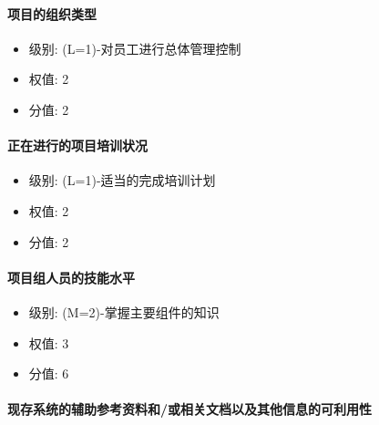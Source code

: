 \documentclass[hyperref, a4paper]{ctexart}
\providecommand{\tightlist}{%
  \setlength{\itemsep}{0pt}\setlength{\parskip}{0pt}}
\let\oldparagraph\paragraph
\renewcommand{\paragraph}[1]{\oldparagraph{#1}\mbox{}}
\begin{document}
\hypertarget{ux9879ux76eeux7684ux7ec4ux7ec7ux7c7bux578b}{%
\paragraph{项目的组织类型}\label{ux9879ux76eeux7684ux7ec4ux7ec7ux7c7bux578b}}

\begin{itemize}
\tightlist
\item
  级别: (L=1)-对员工进行总体管理控制
\item
  权值: 2
\item
  分值: 2
\end{itemize}

\hypertarget{ux6b63ux5728ux8fdbux884cux7684ux9879ux76eeux57f9ux8badux72b6ux51b5}{%
\paragraph{正在进行的项目培训状况}\label{ux6b63ux5728ux8fdbux884cux7684ux9879ux76eeux57f9ux8badux72b6ux51b5}}

\begin{itemize}
\tightlist
\item
  级别: (L=1)-适当的完成培训计划
\item
  权值: 2
\item
  分值: 2
\end{itemize}

\hypertarget{ux9879ux76eeux7ec4ux4ebaux5458ux7684ux6280ux80fdux6c34ux5e73}{%
\paragraph{项目组人员的技能水平}\label{ux9879ux76eeux7ec4ux4ebaux5458ux7684ux6280ux80fdux6c34ux5e73}}

\begin{itemize}
\tightlist
\item
  级别: (M=2)-掌握主要组件的知识
\item
  权值: 3
\item
  分值: 6
\end{itemize}

\hypertarget{ux73b0ux5b58ux7cfbux7edfux7684ux8f85ux52a9ux53c2ux8003ux8d44ux6599ux548cux6216ux76f8ux5173ux6587ux6863ux4ee5ux53caux5176ux4ed6ux4fe1ux606fux7684ux53efux5229ux7528ux6027}{%
\paragraph{现存系统的辅助参考资料和/或相关文档以及其他信息的可利用性}\label{ux73b0ux5b58ux7cfbux7edfux7684ux8f85ux52a9ux53c2ux8003ux8d44ux6599ux548cux6216ux76f8ux5173ux6587ux6863ux4ee5ux53caux5176ux4ed6ux4fe1ux606fux7684ux53efux5229ux7528ux6027}}
\end{document}
